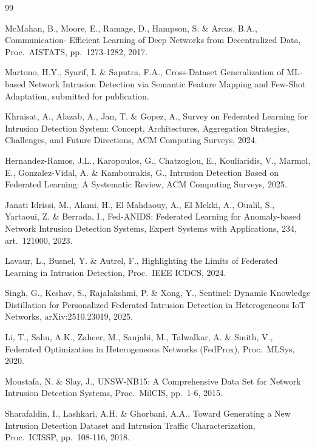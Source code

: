 \documentclass[11pt,a4paper]{article}
\begin{document}
\begin{thebibliography}{99}
\setlength{\itemsep}{2pt}

McMahan, B., Moore, E., Ramage, D., Hampson, S. \& Arcas, B.A., Communication-%
Efficient Learning of Deep Networks from Decentralized Data, Proc.\ AISTATS,
pp.~1273-1282, 2017.

Martono, H.Y., Syarif, I. \& Saputra, F.A., Cross-Dataset Generalization of
ML-based Network Intrusion Detection via Semantic Feature Mapping and Few-Shot
Adaptation, submitted for publication.

Khraisat, A., Alazab, A., Jan, T. \& Gopez, A., Survey on Federated Learning for
Intrusion Detection System: Concept, Architectures, Aggregation Strategies,
Challenges, and Future Directions, ACM Computing Surveys, 2024.

Hernandez-Ramos, J.L., Karopoulos, G., Chatzoglou, E., Kouliaridis, V., Marmol,
E., Gonzalez-Vidal, A. \& Kambourakis, G., Intrusion Detection Based on Federated
Learning: A Systematic Review, ACM Computing Surveys, 2025.

Janati Idrissi, M., Alami, H., El Mahdaouy, A., El Mekki, A., Oualil, S.,
Yartaoui, Z. \& Berrada, I., Fed-ANIDS: Federated Learning for Anomaly-based
Network Intrusion Detection Systems, Expert Systems with Applications, 234,
art.~121000, 2023.

Lavaur, L., Busnel, Y. \& Autrel, F., Highlighting the Limits of Federated
Learning in Intrusion Detection, Proc.\ IEEE ICDCS, 2024.

Singh, G., Keshav, S., Rajalakshmi, P. \& Xong, Y., Sentinel: Dynamic Knowledge
Distillation for Personalized Federated Intrusion Detection in Heterogeneous IoT
Networks, arXiv:2510.23019, 2025.

Li, T., Sahu, A.K., Zaheer, M., Sanjabi, M., Talwalkar, A. \& Smith, V.,
Federated Optimization in Heterogeneous Networks (FedProx), Proc.\ MLSys, 2020.

Moustafa, N. \& Slay, J., UNSW-NB15: A Comprehensive Data Set for Network
Intrusion Detection Systems, Proc.\ MilCIS, pp.~1-6, 2015.

Sharafaldin, I., Lashkari, A.H. \& Ghorbani, A.A., Toward Generating a New
Intrusion Detection Dataset and Intrusion Traffic Characterization, Proc.\
ICISSP, pp.~108-116, 2018.

\end{thebibliography}
\end{document}
